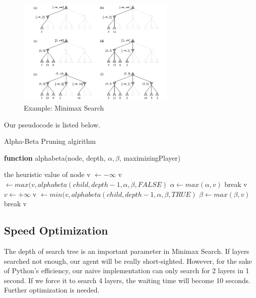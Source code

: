 \documentclass[12pt,a4paper]{article}
\begin{document}
\begin{figure}[!h]
\centering\includegraphics[width=3in]{4.png}
\caption{Example: Minimax Search}
\end{figure}

Our pseudocode is listed below.

\begin{algorithm}[!h]
\caption{Alpha-Beta Pruning algirithm} 
\hspace*{0.02in} {\bf function} 
alphabeta(node, depth, $\alpha, \beta$, maximizingPlayer)
\begin{algorithmic}
	\State \Return the heuristic value of node
		\State v $\gets - \infty$ 
			\State v $\gets max(v, alphabeta(child, depth - 1, \alpha, \beta, FALSE)$
			\State $\alpha \gets max(\alpha, v)$ 
			\If{$\beta \leq \alpha$}
				\State break
			\EndIf
		\State \Return v
		\EndFor
	\Else
		\State $v \gets + \infty$
			\State v $\gets min(v, alphabeta(child, depth - 1, \alpha, \beta, TRUE)$
			\State $\beta \gets max(\beta, v)$ 
			\If{$\beta \leq \alpha$}
				\State break
			\EndIf
		\State \Return v
		\EndFor
	\EndIf
\EndIf
\end{algorithmic}
\end{algorithm}


\subsection{Speed Optimization}
The depth of search tree is an important parameter in Minimax Search. If layers searched not enough, our agent will be really short-sighted. However, for the sake of Python's efficiency, our naive implementation can only search for 2 layers in 1 second. If we force it to search 4 layers, the waiting time will become 10 seconds. Further optimization is needed.
\end{document}
